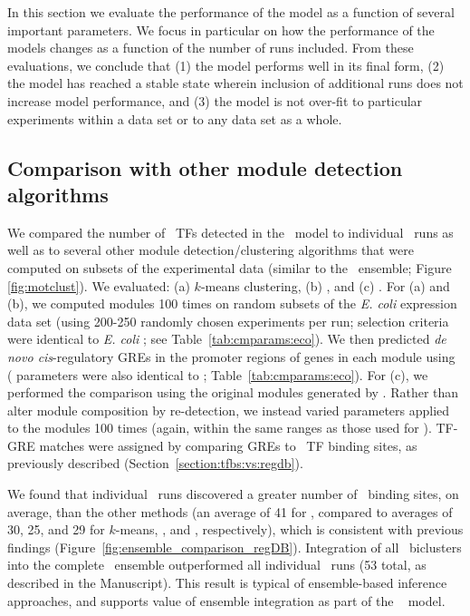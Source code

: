 In this section we evaluate the performance of the model as a function
of several important parameters. We focus in particular on how the
performance of the models changes as a function of the number of runs
included. From these evaluations, we conclude that (1) the model
performs well in its final form, (2) the model has reached a stable
state wherein inclusion of additional runs does not increase model
performance, and (3) the model is not over-fit to particular
experiments within a data set or to any data set as a whole.

\subsection{Comparison with other module detection algorithms}

We compared the number of \rdb~TFs detected in the \egrine~model to individual
\cm~runs as well as to several other module detection/clustering
algorithms that were computed on subsets of the experimental data
(similar to the \egrine~ensemble; Figure \ref{fig:motclust}). We
evaluated: (a) $k$-means clustering, (b) 
\cite{Langfelder2008}, and (c) 
\cite{Lemmens2009}. For (a) and (b), we computed modules 100 times on
random subsets of the {\it E. coli} expression data set (using 200-250
randomly chosen experiments per run; selection criteria were identical
to {\it E. coli} \egrine; see Table~\ref{tab:cmparams:eco}). We then
predicted {\it de novo cis}-regulatory GREs in the promoter regions of genes
in each module using  ( parameters were also
identical to \egrine; Table~\ref{tab:cmparams:eco}). For (c), we
performed the comparison using the original modules generated by
\cite{Lemmens2009}. Rather than alter module composition by
re-detection, we instead varied  parameters applied to
the modules 100 times (again, within the same ranges as those used for
\egrine). TF-GRE matches were assigned by comparing GREs to
\rdb~TF binding sites, as previously described
(Section~\ref{section:tfbs:vs:regdb}).

We found that individual \cm~runs discovered a greater number of
\rdb~binding sites, on average, than the other methods (an average of
41 for \cm, compared to averages of 30, 25, and 29 for $k$-means,
, and , respectively), which is
consistent with previous findings \cite{Reiss2006n}
(Figure~\ref{fig:ensemble_comparison_regDB}). Integration of all
\cm~biclusters into the complete \egrine~ensemble outperformed all
individual \cm~runs (53 total, as described in the Manuscript). This
result is typical of ensemble-based inference approaches, and supports
value of ensemble integration as part of the \egrine~ model.

